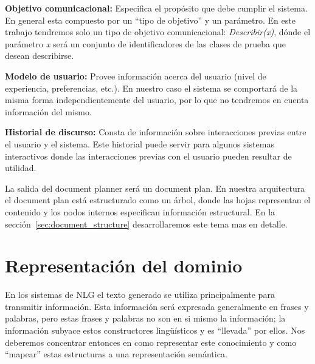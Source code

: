 \bigskip
\noindent
\textbf{Objetivo comunicacional:} Especifica el propósito que debe cumplir el sistema. En general esta compuesto por un ``tipo de objetivo'' y un parámetro.
En este trabajo tendremos solo un tipo de objetivo comunicacional: \emph{Describir(x)}, dónde el parámetro \emph{x} será un conjunto de identificadores de las clases de prueba que desean describirse.

\bigskip
\noindent
\textbf{Modelo de usuario:} Provee información acerca del usuario (nivel de experiencia, preferencias, etc.). En nuestro caso el sistema se comportará de la misma forma independientemente del usuario, por lo que no tendremos en cuenta información del mismo.

\bigskip
\noindent
\textbf{Historial de discurso:} Consta de información sobre interacciones previas entre el usuario y el sistema. Este historial puede servir para algunos sistemas interactivos donde las interacciones previas con el usuario pueden resultar de utilidad. 

\bigskip
La salida del document planner será un document plan. En nuestra arquitectura el document plan está estructurado como un árbol, donde las hojas representan el contenido y los nodos internos especifican información estructural. En la sección~\ref{sec:document_structure} desarrollaremos este tema mas en detalle.

\section{Representación del dominio}

En los sistemas de NLG el texto generado se utiliza principalmente para transmitir información. Esta información será expresada generalmente en frases y palabras, pero estas  frases y palabras no son en si mismo la información; la información subyace estos constructores lingüísticos y es ``llevada'' por ellos. Nos deberemos concentrar entonces en como representar este conocimiento y como ``mapear'' estas estructuras a una representación semántica. 

